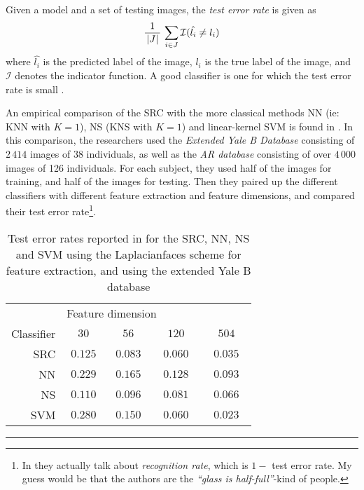 Given a model and a set of testing images, the \textit{test error rate} is given as
\begin{equation}
	\label{eq:errorrate}
	\dfrac{1}{\,\left|J\right|\,} \, \sum_{i\in J} \mathcal{I}(\hat{l_{i}} \neq l_{i})
\end{equation}
where $ \hat{l_{i}} $ is the predicted label of the image, $ l_{i} $ is the true label of the image, and $ \mathcal{I} $ denotes the indicator function. A good classifier is one for which the test error rate is small \cite[Section~2.2]{ISLR}.

An empirical comparison of the SRC with the more classical methods NN (ie: KNN with $ K = 1 $), NS (KNS with $ K=1 $) and linear-kernel SVM is found in \cite{wright09facerecog}. In this comparison, the researchers used the \textit{Extended Yale B Database} consisting of $ 2\,414 $ images of $ 38 $ individuals, as well as the \textit{AR database} consisting of over $ 4\,000 $ images of 126 individuals. For each subject, they used half of the images for training, and half of the images for testing. Then they paired up the different classifiers with different feature extraction and feature dimensions, and compared their test error rate\footnote{In \cite{wright09facerecog} they actually talk about \textit{recognition rate}, which is $ 1 - $ test error rate. My guess would be that the authors are the \textit{``glass is half-full''}-kind of people.}.

\begin{table}[t]
	\centering
	\renewcommand{\arraystretch}{1.2}
	\begin{tabular}{r | c c c c}
		           & \multicolumn{4}{l}{\quad Feature dimension}                                 \\
		Classifier & $ \quad30\quad $ & $ \quad56\quad $ & $ \quad120\quad $ & $ \quad504\quad $ \\ \hline
		       SRC & $ 0.125 $        & $ 0.083 $        & $ 0.060 $         & $ 0.035 $         \\
		        NN & $ 0.229 $        & $ 0.165 $        & $ 0.128 $         & $ 0.093 $         \\
		        NS & $ 0.110 $        & $ 0.096 $        & $ 0.081 $         & $ 0.066 $         \\
		       SVM & $ 0.280 $        & $  0.150 $       & $ 0.060 $         & $ 0.023 $
	\end{tabular}
	\renewcommand{\arraystretch}{1}
	\caption{Test error rates reported in \cite{wright09facerecog} for the SRC, NN, NS and SVM using the Laplacianfaces scheme for feature extraction, and using the extended Yale B database}
	\label{table:errorrates}
	\vspace{4pt}\hrule
\end{table}

